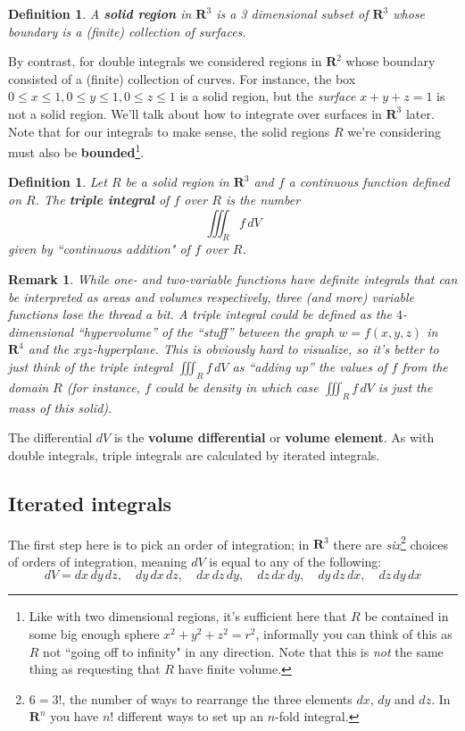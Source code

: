 \documentclass[12pt]{article}
\numberwithin{equation}{subsection}
\numberwithin{figure}{subsection}
\newtheorem{defn}[subsection]{Definition}
\theoremstyle{note}
\newtheorem{remark}[subsection]{Remark}
\begin{document}
{\begin{defn} \label{def-solid-region} A \textbf{solid region} in $\mathbf{R}^3$ is a 3 dimensional subset of $\mathbf{R}^3$ whose \textit{boundary} is a (finite) collection of surfaces.\end{defn}

By contrast, for double integrals we considered regions in $\mathbf{R}^2$ whose boundary consisted of a (finite) collection of curves. For instance, the box $0\leq x\leq 1, 0\leq y\leq 1, 0\leq z\leq 1$ is a solid region, but the \textit{surface} $x+y+z=1$ is not a solid region. We'll talk about how to integrate over surfaces in $\mathbf{R}^3$ later. 
Note that for our integrals to make sense, the solid regions $R$ we're considering must also be \textbf{bounded}\footnote{Like with two dimensional regions, it's sufficient here that $R$ be contained in some big enough sphere $x^2+y^2+z^2=r^2$, informally you can think of this as $R$ not ``going off to infinity" in any direction. Note that this is \textit{not} the same thing as requesting that $R$ have finite volume.}. 
	
	\begin{defn} Let $R$ be a solid region in $\mathbf{R}^3$ and $f$ a continuous function defined on $R$. The \textbf{triple integral} of $f$ over $R$ is the number \begin{equation} \iiint_R f\,dV\end{equation} given by ``continuous addition" of $f$ over $R$.
	\end{defn}
	
	\begin{remark}While one- and two-variable functions have definite integrals that can be interpreted as areas and volumes respectively, three (and more) variable functions lose the thread a bit. A triple integral \textit{could} be defined as  the $4$-dimensional ``hypervolume'' of the ``stuff'' between the graph $w=f(x,y,z)$ in $\mathbf{R}^4$ and the $xyz$-hyperplane. This is obviously hard to visualize, so it's better to just think of the triple integral $\iiint_R f\,dV$ as ``adding up'' the values of $f$ from the domain $R$ (for instance, $f$ could be density in which case $\iiint_R f\,dV$ is just the mass of this solid). \end{remark}

The differential $dV$ is the \textbf{volume differential} or \textbf{volume element}. As with double integrals, triple integrals are calculated by iterated integrals.
	
	
\subsection{Iterated integrals}
The first step here is to pick an order of integration; in $\mathbf{R}^3$ there are \textit{six}\footnote{$6=3!$, the number of ways to rearrange the three elements $dx$, $dy$ and $dz$. In $\mathbf{R}^n$ you have $n!$ different ways to set up an $n$-fold integral.} choices of orders of integration, meaning $dV$ is equal to any of the following: \[ dV=dx\,dy\,dz, \quad dy\,dx\,dz, \quad dx\,dz\,dy, \quad dz\,dx\,dy, \quad dy\,dz\,dx, \quad dz\,dy\,dx\]

}
\end{document}
